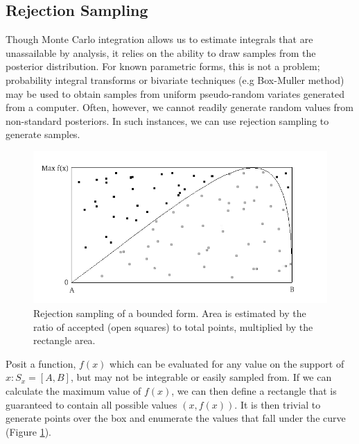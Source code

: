 
\hypertarget{rejection-sampling}{}
\subsection*{Rejection Sampling}

Though Monte Carlo integration allows us to estimate integrals that are unassailable by analysis, it relies on the ability to draw samples from the posterior distribution. For known parametric forms, this is not a problem; probability integral transforms or bivariate techniques (e.g Box-Muller method) may be used to obtain samples from uniform pseudo-random variates generated from a computer. Often, however, we cannot readily generate random values from non-standard posteriors. In such instances, we can use rejection sampling to generate samples.

\begin{figure}[ht]
        \begin{center}
        \includegraphics[scale=0.4]{reject.png}
    \end{center}
    \caption{Rejection sampling of a bounded form. Area is estimated by the ratio of accepted (open squares) to total points, multiplied by the rectangle area.}
    \label{fig:bound}
\end{figure}

Posit a function, $f(x)$ which can be evaluated for any value on the support of $x:S_x = [A,B]$, but may not be integrable or easily sampled from. If we can calculate the maximum  value of $f(x)$, we can then define a rectangle that is guaranteed to contain all possible values $(x,f(x))$. It is then trivial to generate points over the box and enumerate the values that fall under the curve (Figure \ref{fig:bound}).


